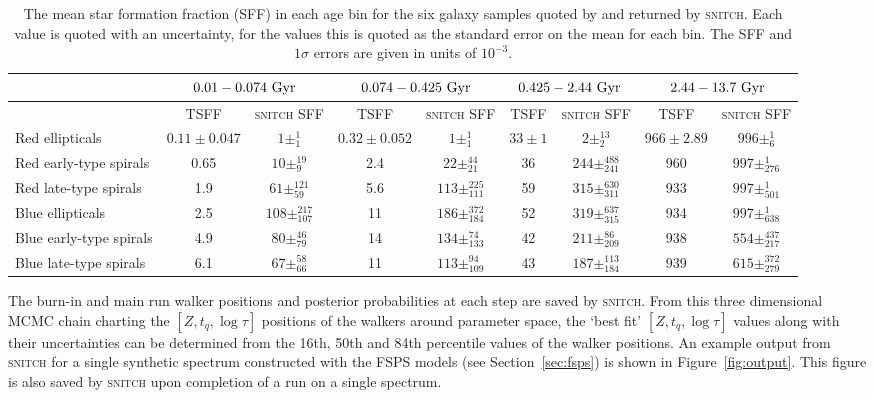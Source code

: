 \documentclass[useAMS,usenatbib]{mn2e}
\begin{document}
\begin{table*}
\centering
\caption{The mean star formation fraction (SFF) in each age bin for the six galaxy samples quoted by \protect\cite[][TSFF]{tojeiro13} and returned by \textsc{snitch}. Each value is quoted with an uncertainty, for the \protect\cite{tojeiro13} values this is quoted as the standard error on the mean for each bin. The SFF and $1\sigma$ errors are given in units of $10^{-3}$.}
\label{table:tojeirocompare}
\begin{tabular*}{0.9\textwidth}{l|cc|cc|cc|cc}
                        & \multicolumn{2}{c|}{$0.01 - 0.074~\rm{Gyr}$}     & \multicolumn{2}{c|}{$0.074 - 0.425~\rm{Gyr}$} & \multicolumn{2}{c|}{$0.425 - 2.44~\rm{Gyr}$} & \multicolumn{2}{c}{$2.44 - 13.7~\rm{Gyr}$} \\ \hline
                        & TSFF & \multicolumn{1}{c|}{\textsc{snitch} SFF} & TSFF          & \textsc{snitch} SFF          & TSFF          & \textsc{snitch} SFF         & TSFF         & \textsc{snitch} SFF        \\ \hline
Red ellipticals         & $0.11\pm0.047$   &  $1\pm_{1}^{1}$ &  $0.32\pm0.052$  &    $1\pm_{1}^{1}$   &  $33\pm1$   &   $2\pm_{2}^{13}$   &  $966\pm2.89$  &   $996\pm_{6}^{1}$   \\
Red early-type spirals  & 0.65   &  $10\pm_{9}^{19}$ &  2.4   &  $22\pm_{21}^{44}$     &  36   &   $244\pm_{241}^{488}$  &  960  &  $997\pm_{276}^{1}$    \\
Red late-type spirals   &  1.9   &  $61\pm_{59}^{121}$  &  5.6   &   $113\pm_{111}^{225}$    &  59   &   $315\pm_{311}^{630}$   &  933  &   $997\pm_{501}^{1}$    \\ \hline
Blue ellipticals        &  2.5   &  $108\pm_{107}^{217}$   &  11    &   $186\pm_{184}^{372}$    &  52   &   $319\pm_{315}^{637}$   &  934  &     $997\pm_{638}^{1}$ \\
Blue early-type spirals &  4.9   &  $80\pm_{79}^{46}$  &  14    &   $134\pm_{133}^{74}$    &  42   &   $211\pm_{209}^{86}$   &  938  &  $554\pm_{217}^{437}$     \\
Blue late-type spirals  &  6.1   &  $67\pm_{66}^{58}$  &  11    &   $113\pm_{109}^{94}$    &  43   &    $187\pm_{184}^{113}$  &  939  & $615\pm_{279}^{372}$                              
\end{tabular*}
\end{table*}

The burn-in and main run walker positions and posterior probabilities at each step are saved by \textsc{snitch}. From this three dimensional MCMC chain charting the $[Z, t_q, \log \tau]$ positions of the walkers around parameter space, the `best fit' $[Z, t_q, \log \tau]$ values along with their uncertainties can be determined from the 16th, 50th and 84th percentile values of the walker positions. An example output from \textsc{snitch} for a single synthetic spectrum constructed with the FSPS models (see Section~\ref{sec:fsps}) is shown in Figure~\ref{fig:output}. This figure is also saved by \textsc{snitch} upon completion of a run on a single spectrum.  
\end{document}
